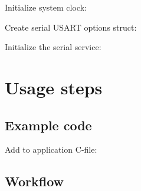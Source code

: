 \begin{DoxyEnumerate}
\item Initialize system clock\+:
\begin{DoxyItemize}
\item 
\begin{DoxyCode}{0}
\end{DoxyCode}

\end{DoxyItemize}
\item Create serial U\+S\+A\+RT options struct\+:
\begin{DoxyItemize}
\item 
\begin{DoxyCode}{0}
\DoxyCodeLine{\};}
\end{DoxyCode}

\end{DoxyItemize}
\item Initialize the serial service\+:
\begin{DoxyItemize}
\item 
\begin{DoxyCode}{0}
\end{DoxyCode}

\end{DoxyItemize}
\end{DoxyEnumerate}\hypertarget{serial_quickstart_serial_basic_use_case_usage}{}\section{Usage steps}\label{serial_quickstart_serial_basic_use_case_usage}
\hypertarget{serial_quickstart_serial_basic_use_case_usage_code}{}\subsection{Example code}\label{serial_quickstart_serial_basic_use_case_usage_code}
Add to application C-\/file\+: 
\begin{DoxyCode}{0}
\end{DoxyCode}
\hypertarget{serial_quickstart_serial_basic_use_case_usage_flow}{}\subsection{Workflow}\label{serial_quickstart_serial_basic_use_case_usage_flow}

